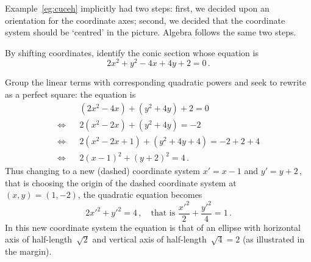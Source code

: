 \begin{description}
\begin{itemize}
\end{itemize}
\end{description}


Example~\ref{eg:cuceh} implicitly had two steps: first, we decided upon an orientation for the coordinate axes; second, we decided that the coordinate system should be `centred' in the picture.
Algebra follows the same two steps.

\begin{example} \label{eg:}
By shifting coordinates, identify the conic section whose equation is
\begin{equation*}
2x^2+y^2-4x+4y+2=0\,.
\end{equation*}
\begin{solution} 
Group the linear terms with corresponding quadratic powers and seek to rewrite as a perfect square: the equation is
\begin{eqnarray*}&&
(2x^2-4x)+(y^2+4y)+2=0
\\\iff&&
2(x^2-2x)+(y^2+4y)=-2
\\\iff&&
2(x^2-2x+1)+(y^2+4y+4)=-2+2+4
\\\iff&&
2(x-1)^2+(y+2)^2=4\,.
\end{eqnarray*}
Thus changing to a new (dashed) coordinate system \(x'=x-1\) and \(y'=y+2\)\,, that is choosing the origin of the dashed coordinate system at \((x,y)=(1,-2)\), the quadratic equation becomes
\begin{equation*}
2{x'}^2+{y'}^2=4\,, \quad\text{that is }
\frac{{x'}^2}{2}+\frac{{y'}^2}{4}=1\,.
\end{equation*}
In this new coordinate system the equation is that of an ellipse with horizontal axis of half-length~\(\sqrt2\) and vertical axis of half-length~\(\sqrt4=2\) (as illustrated in the margin).
\end{solution}
\end{example}


